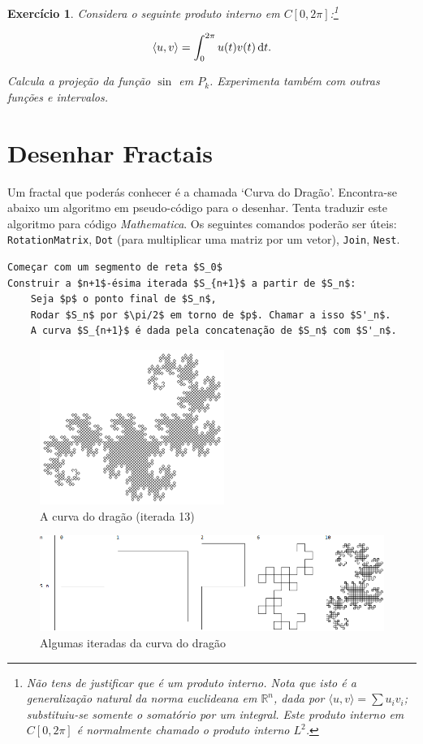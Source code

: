 \documentclass{article}
\newtheorem{ex}{Exercício}[section]
\newcommand{\R}{\mathbb{R}}
\begin{document}
\begin{ex}
Considera o seguinte produto interno em $C[0,2\pi]$:\footnote{Não tens de justificar que é um produto interno. Nota que isto é a generalização natural da norma euclideana em $\R^n$, dada por $\langle u, v \rangle = \sum u_i v_i$; substituiu-se somente o somatório por um integral. Este produto interno em $C[0,2\pi]$ é normalmente chamado o produto interno $L^2$.}

\[\langle u, v \rangle = \int_0^{2\pi} u(t) v(t) \dl t.\]

Calcula a projeção da função $\sin$ em $P_k$. Experimenta também com outras funções e intervalos.
\end{ex}

\section{Desenhar Fractais}

Um fractal que poderás conhecer é a chamada `Curva do Dragão'. Encontra-se abaixo um algoritmo em pseudo-código para o desenhar. Tenta traduzir este algoritmo para código \textit{Mathematica}. Os seguintes comandos poderão ser úteis: \texttt{RotationMatrix}, \texttt{Dot} (para multiplicar uma matriz por um vetor), \texttt{Join}, \texttt{Nest}.

\begin{lstlisting}
Começar com um segmento de reta $S_0$
Construir a $n+1$-ésima iterada $S_{n+1}$ a partir de $S_n$:
	Seja $p$ o ponto final de $S_n$,
	Rodar $S_n$ por $\pi/2$ em torno de $p$. Chamar a isso $S'_n$.
	A curva $S_{n+1}$ é dada pela concatenação de $S_n$ com $S'_n$.
\end{lstlisting}

\begin{figure}
\centering
\includegraphics[width=6cm]{dragon.png}
\caption{A curva do dragão (iterada 13)}
\end{figure}
\begin{figure}
\centering
\includegraphics[width=\textwidth]{dragontable.png}
\caption{Algumas iteradas da curva do dragão}
\end{figure}
\end{document}

